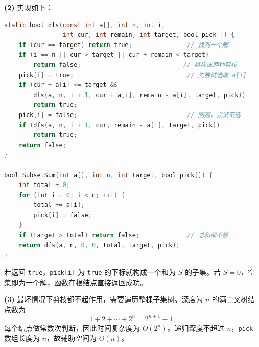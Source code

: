 \begin{enumerate}[resume]
\textbf{(2)} 实现如下：
\begin{lstlisting}[language=C]
static bool dfs(const int a[], int n, int i,
                int cur, int remain, int target, bool pick[]) {
    if (cur == target) return true;               // 找到一个解
    if (i == n || cur > target || cur + remain < target)
        return false;                            // 越界或两种剪枝
    pick[i] = true;                               // 先尝试选取 a[i]
    if (cur + a[i] <= target &&
        dfs(a, n, i + 1, cur + a[i], remain - a[i], target, pick))
        return true;
    pick[i] = false;                              // 回溯，尝试不选
    if (dfs(a, n, i + 1, cur, remain - a[i], target, pick))
        return true;
    return false;
}

bool SubsetSum(int a[], int n, int target, bool pick[]) {
    int total = 0;
    for (int i = 0; i < n; ++i) {
        total += a[i];
        pick[i] = false;
    }
    if (target > total) return false;             // 总和都不够
    return dfs(a, n, 0, 0, total, target, pick);
}
\end{lstlisting}
若返回 \texttt{true}，\texttt{pick[i]} 为 \texttt{true} 的下标就构成一个和为 $S$ 的子集。若 $S=0$，空集即为一个解，函数在根结点直接返回成功。

\textbf{(3)} 最坏情况下剪枝都不起作用，需要遍历整棵子集树。深度为 $n$ 的满二叉树结点数为
\[
1+2+\cdots+2^n=2^{n+1}-1,
\]
每个结点做常数次判断，因此时间复杂度为 $O(2^n)$。递归深度不超过 $n$，\texttt{pick} 数组长度为 $n$，故辅助空间为 $O(n)$。\else \answerarea[14] \fi

\end{enumerate}

\vspace{8pt}
